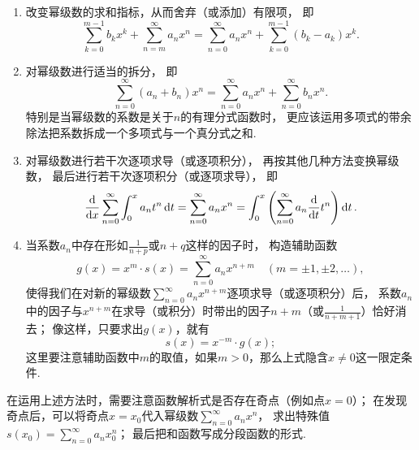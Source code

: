 \begin{enumerate}
\begin{enumerate}
		\item 改变幂级数的求和指标，从而舍弃（或添加）有限项，
		即\[
			\sum_{k=0}^{m-1} b_k x^k + \sum_{n=m}^\infty a_n x^n
			= \sum_{n=0}^\infty a_n x^n + \sum_{k=0}^{m-1} (b_k-a_k) x^k.
		\]

		\item 对幂级数进行适当的拆分，
		即\[
			\sum_{n=0}^\infty (a_n + b_n) x^n
			= \sum_{n=0}^\infty a_n x^n
			+ \sum_{n=0}^\infty b_n x^n.
		\]
		特别是当幂级数的系数是关于\(n\)的有理分式函数时，
		更应该运用多项式的带余除法把系数拆成一个多项式与一个真分式之和.

		\item 对幂级数进行若干次逐项求导（或逐项积分），
		再按其他几种方法变换幂级数，
		最后进行若干次逐项积分（或逐项求导），
		即\[
			\dv{x} \sum_{n=0}^\infty \int_0^x a_n t^n \dd{t}
			= \sum_{n=0}^\infty a_n x^n
			= \int_0^x \left(\sum_{n=0}^\infty a_n \dv{t} t^n\right) \dd{t}.
		\]

		\item 当系数\(a_n\)中存在形如\(\frac{1}{n+p}\)或\(n+q\)这样的因子时，
		构造辅助函数\[
			g(x) = x^m \cdot s(x) = \sum_{n=0}^\infty a_n x^{n+m}
			\quad(m=\pm1,\pm2,\dotsc),
		\]
		使得我们在对新的幂级数\(\sum_{n=0}^\infty a_n x^{n+m}\)逐项求导（或逐项积分）后，
		系数\(a_n\)中的因子与\(x^{n+m}\)在求导（或积分）时带出的因子\(n+m\)（或\(\frac{1}{n+m+1}\)）恰好消去；
		像这样，只要求出\(g(x)\)，就有\[
			s(x) = x^{-m} \cdot g(x);
		\]
		这里要注意辅助函数中\(m\)的取值，如果\(m>0\)，那么上式隐含\(x\neq0\)这一限定条件.
	\end{enumerate}
	在运用上述方法时，需要注意函数解析式是否存在奇点（例如点\(x=0\)）；
	在发现奇点后，可以将奇点\(x=x_0\)代入幂级数\(\sum_{n=0}^\infty a_n x^n\)，
	求出特殊值\(s(x_0) = \sum_{n=0}^\infty a_n x_0^n\)；
	最后把和函数写成分段函数的形式.
\end{enumerate}

